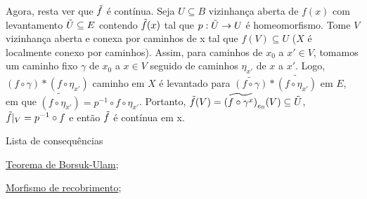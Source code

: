 \begin{dem}
    Agora, resta ver que $\Tilde{f}$ é contínua. Seja $U \subseteq B$ vizinhança aberta de $f(x)$ com levantamento $\Tilde{U} \subseteq E$ contendo $\Tilde{f}(x)$ tal que $p: \Tilde{U} \rightarrow U$ é homeomorfismo. Tome $V$ vizinhança aberta e conexa por caminhos de x tal que $f(V) \subseteq U$ ($X$ é localmente conexo por caminhos). Assim, para caminhos de $x_0$ a $x' \in V$, tomamos um caminho fixo $\gamma$ de $x_0$ a $x \in V$ seguido de caminhos $\eta_{x'}$ de $x$ a $x'$. Logo, $(f \circ \gamma) \ast (f \circ \eta_{x'})$ caminho em $X$ é levantado para $\widetilde{(f \circ \gamma)} \ast \widetilde{(f \circ \eta_{x'})}$ em $E$, em que $\widetilde{(f \circ \eta_{x'})} = p^{-1} \circ f \circ  \eta_{x'}$. Portanto, $\Tilde{f}(V) = \widetilde{(f \circ \gamma^{x})}_{e_0} (V) \subseteq \Tilde{U}$, $\Tilde{f}|_V = p^{-1} \circ f$ e então $\Tilde{f}$ é contínua em x.
     
\end{dem}
\begin{titlemize}{Lista de consequências}
	\item \hyperref[teo-borsuk-ulam-prop]{Teorema de Borsuk-Ulam};\\ %
 	\item \hyperref[espaco-de-recobrimento-morfismo-de-recobrimento-def]{Morfismo de recobrimento};
\end{titlemize}

